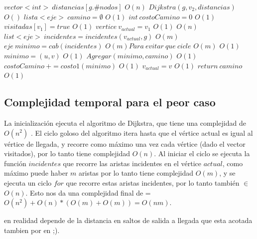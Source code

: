 \begin{algorithmic}


\State $vector<int> \: distancias[g.\#nodos]$
\Comment $ O(n) $
\State $ Dijkstra( g, v_2, distancias) $
\Comment $ O() $
\State $lista<eje> \: camino= \emptyset$
\Comment $ O(1) $
\State $ int \: costoCamino = 0 $
\Comment $ O(1) $
\State $ visitadas[v_1] = true $
\Comment $ O(1) $
\State $ vertice \: v_{actual} = v_1 $
\Comment $ O(1) $
\Comment $ O(n) $
	\State $ list<eje> \: incidentes = incidentes(v_{actual}, g) $
	\Comment $ O(m) $
	\State $ eje \:	 minimo = cab(incidentes) $
	\Comment $ O(m) Para\: evitar \:que \:cicle $
	\Comment $ O(m) $
		\Comment $ O(1) $
			\State $ minimo = (u,v) $
			\Comment $ O(1) $
		\EndIf
	\EndFor
	\State $ Agregar(minimo, camino) $
	\Comment $ O(1) $
	\State $ costoCamino \: += costo1(minimo) $
	\Comment $ O(1) $
	\State $ v_{actual} = v $
	\Comment $ O(1) $
\EndWhile
\State $ return \: camino $
\Comment $ O(1) $

\EndProcedure

\end{algorithmic}




\subsection{Complejidad temporal para el peor caso}

La inicializaci\'on ejecuta el algoritmo de Dijkstra, que tiene una complejidad de $O(n^2)$ . El ciclo goloso del algoritmo itera hasta que el v\'ertice actual es igual al v\'ertice de llegada, y recorre como m\'aximo una vez cada v\'ertice (dado el vector visitados), por lo tanto tiene complejidad $O(n)$. Al iniciar el ciclo se ejecuta la funci\'on $incidentes$ que recorre las aristas incidentes en el v\'ertice $actual$, como m\'aximo puede haber $m$ aristas por lo tanto tiene complejidad $O(m)$, y se ejecuta un ciclo $for$ que recorre estas aristas incidentes, por lo tanto tambi\'en $\in$ $O(n)$. Esto nos da una complejidad final de = $ O(n^2)+ O(n)*(O(m)+O(m)) = O(nm)$. 

en realidad depende de la distancia en saltos de salida a llegada que esta acotada tambien por en ;).